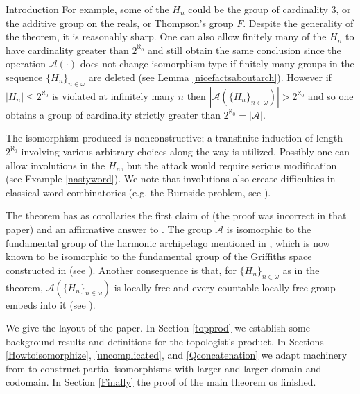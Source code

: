 \documentclass{amsart}
\theoremstyle{definition}\newtheorem{theorem}{Theorem}
\theoremstyle{definition}\newtheorem*{A}{Main Theorem}
\theoremstyle{definition}\newtheorem*{B}{Theorem \ref{elementaryequiv}}
\theoremstyle{definition}\newtheorem*{C}{Theorem \ref{continuous}}
\theoremstyle{definition}\newtheorem*{D}{Theorem \ref{bigisomorphism2}}
\theoremstyle{definition}\newtheorem{bigtheorem}{Main Theorem}
\numberwithin{theorem}{section}
\theoremstyle{definition}\newtheorem{corollary}[theorem]{Corollary}
\theoremstyle{definition}\newtheorem{proposition}[theorem]{Proposition}
\theoremstyle{definition}\newtheorem{definition}[theorem]{Definition}
\theoremstyle{definition}\newtheorem{question}[theorem]{Question}
\theoremstyle{definition}\newtheorem{example}[theorem]{Example}
\theoremstyle{definition}\newtheorem{remark}[theorem]{Remark}
\theoremstyle{definition}\newtheorem{note}[theorem]{Note}
\theoremstyle{definition}\newtheorem{lemma}[theorem]{Lemma}
\theoremstyle{definition}\newtheorem{fact}[theorem]{Fact}
\theoremstyle{definition}\newtheorem{define}[theorem]{Definition}
\theoremstyle{definition}\newtheorem{claim}[theorem]{Claim}
\theoremstyle{definition}\newtheorem{obs}[theorem]{Observation}
\theoremstyle{definition}\newtheorem{definitions}[theorem]{Definitions}
\begin{document}
\begin{section}{Introduction}
For example, some of the $H_n$ could be the group of cardinality $3$, or the additive group on the reals, or Thompson's group $F$.  Despite the generality of the theorem, it is reasonably sharp.  One can also allow finitely many of the $H_n$ to have cardinality greater than $2^{\aleph_0}$ and still obtain the same conclusion since the operation $\mathcal{A}(\cdot)$ does not change isomorphism type if finitely many groups in the sequence $\{H_n\}_{n \in \omega}$ are deleted (see Lemma \ref{nicefactsaboutarch}).  However if $|H_n| \leq 2^{\aleph_0}$ is violated at infinitely many $n$ then $|\mathcal{A}(\{H_n\}_{n \in \omega})| > 2^{\aleph_0}$  \cite[Theorem 9]{CHM} and so one obtains a group of cardinality strictly greater than $2^{\aleph_0} = |\mathcal{A}|$.

The isomorphism produced is nonconstructive; a transfinite induction of length $2^{\aleph_0}$ involving various arbitrary choices along the way is utilized.  Possibly one can allow involutions in the $H_n$, but the attack would require serious modification (see Example \ref{nastyword}).  We note that involutions also create difficulties in classical word combinatorics (e.g. the Burnside problem, see  \cite[page 139]{Ol}).

The theorem has as corollaries the first claim of \cite[Theorem A]{CHM} (the proof was incorrect in that paper) and an affirmative answer to \cite[Question 2]{CHM}.  The group $\mathcal{A}$ is isomorphic to the fundamental group of the harmonic archipelago mentioned in \cite{BS}, which is now known to be isomorphic to the fundamental group of the Griffiths space constructed in \cite{G} (see \cite{Cors}).  Another consequence is that, for $\{H_n\}_{n\in \omega}$ as in the theorem, $\mathcal{A}(\{H_n\}_{n \in \omega})$ is locally free and every countable locally free group embeds into it (see \cite[Theorem 2]{Ho}).


We give the layout of the paper.  In Section \ref{topprod} we establish some background results and definitions for the topologist's product.  In Sections \ref{Howtoisomorphize}, \ref{uncomplicated}, and \ref{Qconcatenation} we adapt machinery from \cite{Cors} to construct partial isomorphisms with larger and larger domain and codomain.  In Section \ref{Finally} the proof of the main theorem os finished.

\end{section}
\end{document}
